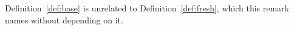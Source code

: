 
\begin{remark}\label{rem:talks}
Definition~\ref{def:base} is unrelated to Definition~\ref{def:fresh}, which
this remark names without depending on it.
\end{remark}
